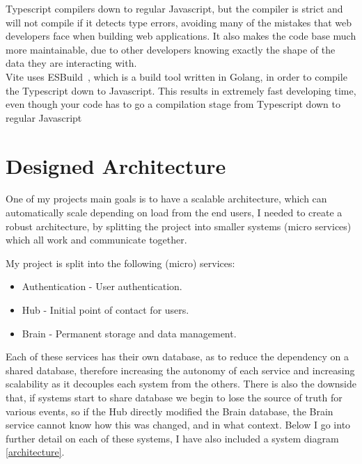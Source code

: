 \documentclass[titlepage]{article}
\begin{document}
Typescript compilers down to regular Javascript, but the compiler is strict and will not compile if it detects type errors, avoiding many of the mistakes that web developers face when building web applications. It also makes the code base much more maintainable, due to other developers knowing exactly the shape of the data they are interacting with. \\

Vite uses ESBuild~\cite{esbuild}, which is a build tool written in Golang, in order to compile the Typescript down to Javascript. This results in extremely fast developing time, even though your code has to go a compilation stage from Typescript down to regular Javascript \\

\pagebreak
\section{Designed Architecture}
One of my projects main goals is to have a scalable architecture, which can automatically scale depending on load from the end users, I needed to create a robust architecture, by splitting the project into smaller systems (micro services) which all work and communicate together.

My project is split into the following (micro) services:
\begin{itemize}
  \item Authentication - User authentication.
  \item Hub - Initial point of contact for users.
  \item Brain - Permanent storage and data management.
\end{itemize}

Each of these services has their own database, as to reduce the dependency on a shared database, therefore increasing the autonomy of each service and increasing scalability as it decouples each system from the others. There is also the downside that, if systems start to share database we begin to lose the source of truth for various events, so if the Hub directly modified the Brain database, the Brain service cannot know how this was changed, and in what context. Below I go into further detail on each of these systems, I have also included a system diagram \ref{architecture}.
\end{document}
